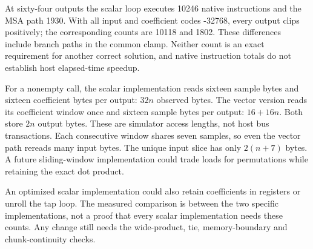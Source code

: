 At sixty-four outputs the scalar loop executes 10246 native instructions and the MSA
path 1930. With all input and coefficient codes -32768, every output clips positively;
the corresponding counts are 10118 and 1802. These differences include branch paths
in the common clamp. Neither count is an exact requirement for another correct solution,
and native instruction totals do not establish host elapsed-time speedup.

For a nonempty call, the scalar implementation reads sixteen sample bytes and sixteen
coefficient bytes per output: \(32n\) observed bytes. The vector version reads its
coefficient window once and sixteen sample bytes per output: \(16+16n\). Both store
\(2n\) output bytes. These are simulator access lengths, not host bus transactions.
Each consecutive window shares seven samples, so even the vector path rereads many
input bytes. The unique input slice has only \(2(n+7)\) bytes. A future sliding-window
implementation could trade loads for permutations while retaining the exact dot product.

An optimized scalar implementation could also retain coefficients in registers or
unroll the tap loop. The measured comparison is between the two specific implementations,
not a proof that every scalar implementation needs these counts. Any change still needs
the wide-product, tie, memory-boundary and chunk-continuity checks.
